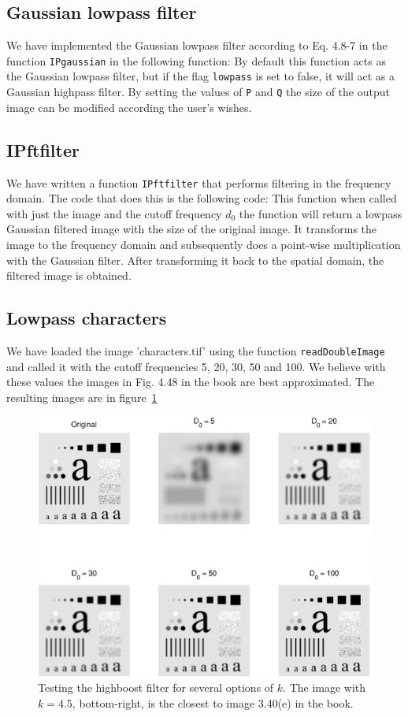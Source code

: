 \setcounter{subsection}{0}
\subsection{Gaussian lowpass filter}
We have implemented the Gaussian lowpass filter according to Eq. 4.8-7 in the function \texttt{IPgaussian} in the following function:
By default this function acts as the Gaussian lowpass filter, but if the flag \texttt{lowpass} is set to false, it will act as a Gaussian highpass filter. By setting the values of \texttt{P} and \texttt{Q} the size of the output image can be modified according the user's wishes.
\subsection{IPftfilter}
We have written a function \texttt{IPftfilter} that performs filtering in the frequency domain. The code that does this is the following code:
This function when called with just the image and the cutoff frequency $d_0$ the function will return a lowpass Gaussian filtered image with the size of the original image. It transforms the image to the frequency domain and subsequently does a point-wise multiplication with the Gaussian filter. After transforming it back to the spatial domain, the filtered image is obtained.
\subsection{Lowpass characters}
We have loaded the image 'characters.tif' using the function \texttt{readDoubleImage} and called it with the cutoff frequencies 5, 20, 30, 50 and 100. We believe with these values the images in Fig. 4.48 in the book are best approximated. The resulting images are in figure~\ref{fig:lowChars}
\begin{figure}[h]
 \centering
 \includegraphics{characters_low_pass.eps}
 \caption{Testing the highboost filter for several options of $k$. The image with $k = 4.5$, bottom-right, is the closest to image 3.40(e) in the book.}
 \label{fig:lowChars}
\end{figure}

